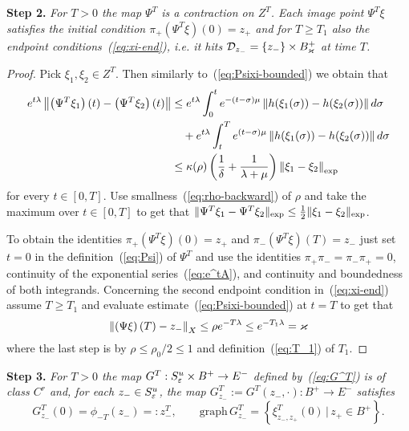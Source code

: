\documentclass{article}
\begin{document}
\noindent
{\bf Step 2.}
{\it For $T>0$ the map $\Psi^T$ is a contraction on $Z^T$. Each image point $\Psi^T\xi$ satisfies
the initial condition $\pi_+\left(\Psi^T\xi\right)(0) =z_+$ and for $T\ge T_1$ also the endpoint 
conditions~(\ref{eq:xi-end}), i.e. it hits ${\mathcal{D}}_{z_-}=\{{z_-}\}\times B^+_\varkappa$ at time $T$.
}

\begin{proof}
Pick $\xi_1,\xi_2\in Z^T$. Then similarly to~(\ref{eq:Psixi-bounded}) we obtain that
\begin{equation*}
\begin{split}
     e^{t\lambda}\Norm{\left(\Psi^T\xi_1\right)(t)
     -\left(\Psi^T\xi_2\right)(t)}
     &\le e^{t\lambda}
      \int_0^t e^{-(t-\sigma)\mu}
      \Norm{h(\xi_1(\sigma))
      -h(\xi_2(\sigma))} d\sigma
   \\
     &\quad
      +e^{t\lambda}\int_t^T e^{(t-\sigma)\mu}
      \Norm{h(\xi_1(\sigma))
      -h(\xi_2(\sigma))} d\sigma
    \\
%
      &\le \kappa(\rho)
       \left(\frac{1}{\delta}
       +\frac{1}{\lambda+\mu} 
       \right)
       \Norm{\xi_1-\xi_2}_{\exp}
\end{split}
\end{equation*}
for every $t\in[0,T]$. Use smallness~(\ref{eq:rho-backward}) of $\rho$
and take the maximum over $t\in[0,T]$ to get that $\mathopen\|\Psi^T\xi_1-\Psi^T\xi_2\mathclose\|_{\exp}
\le\frac{1}{2}\mathopen\|\xi_1-\xi_2\mathclose\|_{\exp}$.

To obtain the identities $\pi_+\left(\Psi^T\xi\right)(0)=z_+$ and
$\pi_-\left(\Psi^T\xi\right)(T)={z_-}$ just
set $t=0$ in the definition~(\ref{eq:Psi}) of $\Psi^T$
and use the identities $\pi_+\pi_-=\pi_-\pi_+=0$,
continuity of the exponential series~(\ref{eq:e^tA}),
and continuity and boundedness of both integrands.
Concerning the second endpoint condition
in~(\ref{eq:xi-end}) assume $T\ge T_1$ and evaluate
estimate~(\ref{eq:Psixi-bounded}) at $t=T$ to get that
$$
     \left\|\left(\Psi\xi\right)(T)
     -{z_-}\right\|_X
     \le \rho
     e^{-T\lambda}
     \le e^{-T_1\lambda}
     =\varkappa
$$
where the last step is by $\rho\le\rho_0/2\le 1$ and definition~(\ref{eq:T_1}) of $T_1$.
\end{proof}

\noindent
{\bf Step 3.}
{\it For $T>0$ the map $G^T:S^u_{\varepsilon}\times B^+\to E^-$ defined by~(\ref{eq:G^T}) is of class $C^r$ and,
for each ${z_-}\in S^u_{\varepsilon}$, the map $G^T_{z_-} :=G^T({z_-},\cdot):B^+\to E^-$ satisfies
$$
     G^T_{z_-}(0)
     =\phi_{-T}({z_-})
     =:{z_-^T}
     ,\qquad
     \mathrm{graph}\, G^T_{z_-}
     =\left\{\xi_{{z_-},z_+}^T(0)
     \,\big|\, 
     z_+\in B^+\right\}.
$$
} 
\end{document}
